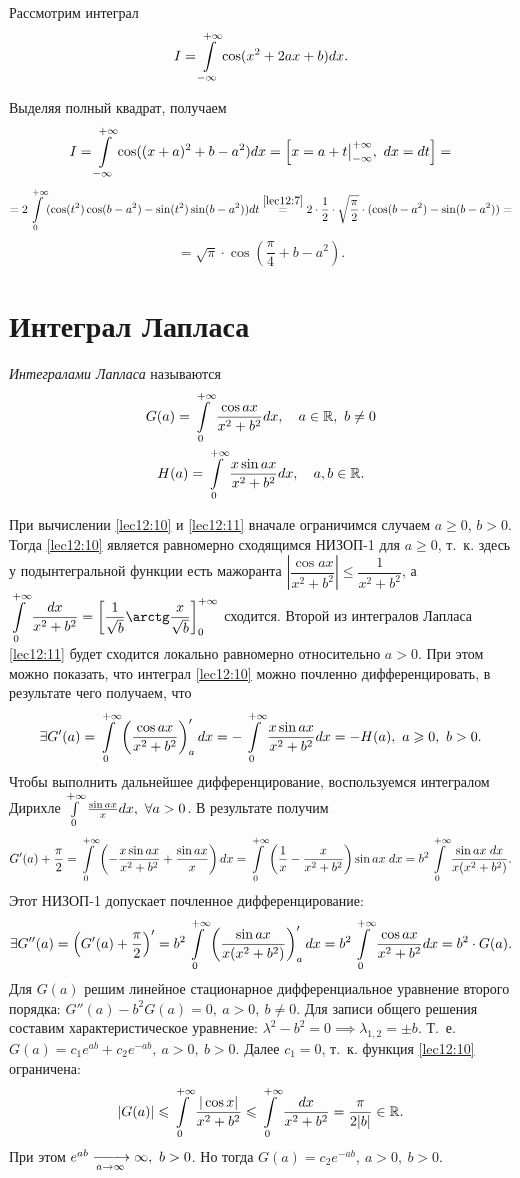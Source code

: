 \documentclass[../../main.tex]{subfiles}
\begin{document}
\begin{exmp}
Рассмотрим интеграл \[I = \int\limits_{-\infty}^{+\infty} \cos(x^2 + 2ax + b) dx.\]

Выделяя полный квадрат, получаем \[I = \int\limits_{-\infty}^{+\infty} \cos((x+a)^2 + b - a^2)dx = 
\left[x = a + t\big|_{-\infty}^{+\infty},\ dx = dt\right] =\]\[= 2 \ioinf 
(\cos(t^2)\cos(b-a^2) - \sin(t^2)\sin(b-a^2)) dt \stk{lec12:7}= 
2\cdot\frac12\cdot \sqrt{\frac\pi2} \cdot (\cos(b - a^2) - \sin(b - a^2)) 
=\]\[ = \sqrt{\pi} \cdot\cos\left(\frac{\pi}4 + b - a^2\right).\]
\end{exmp}

\section{Интеграл Лапласа}

\emph{Интегралами Лапласа} называются
\begin{gather}
\label{lec12:10}
G(a) = \int\limits_{0}^{+\infty} \frac{\cos ax}{x^2 + b^2} dx,\quad a \in \mathbb{R},\ b \ne 0 \\
\label{lec12:11}
H(a) = \int\limits_{0}^{+\infty} \frac{x\sin ax}{x^2 + b^2} dx,\quad a, b \in \mathbb{R}. 
\end{gather}

При вычислении \eqref{lec12:10} и \eqref{lec12:11} вначале ограничимся случаем 
$a \ge 0$, $b > 0$. Тогда \eqref{lec12:10} является равномерно сходящимся 
НИЗОП-1 для $a \ge 0$, т.~к. здесь у подынтегральной функции есть мажоранта 
$\left|\dfrac{\cos{ax}}{x^2 + b^2}\right| \le \dfrac1{x^2 + b^2}$, а 
$\displaystyle\ioinf \frac{dx}{x^2 + b^2} = \left[\frac1{\sqrt b}\arctg\frac 
x{\sqrt b}\right]_0^{+\infty}$ сходится. Второй из интегралов Лапласа 
\eqref{lec12:11} будет сходится локально равномерно относительно $a > 0$. При 
этом можно показать, что интеграл \eqref{lec12:10}  можно почленно 
дифференцировать, в результате чего получаем, что
\[\exists G'(a) = \int\limits_{0}^{+\infty} \left(\frac{\cos ax}{x^2 + b^2}\right)'_a dx = 
-\int\limits_{0}^{+\infty} \frac{x\sin ax}{x^2+b^2} dx = -H(a),\ a \geqslant 0,\ b > 0.\]
Чтобы выполнить дальнейшее дифференцирование, воспользуемся интегралом Дирихле 
$\int\limits_{0}^{+\infty} \frac{\sin ax}x dx,\ \forall a > 0$. В результате получим \[G'(a) + 
\frac\pi2 = \int\limits_{0}^{+\infty} \left(-\frac{x \sin ax}{x^2 + b^2} + \frac{\sin 
ax}{x}\right)dx = \int\limits_{0}^{+\infty} \left(\frac1x - \frac{x}{x^2+b^2}\right)\sin ax\;dx = 
b^2 \int\limits_{0}^{+\infty} \frac{\sin ax\;dx}{x(x^2 + b^2)}.\]
Этот НИЗОП-1 допускает почленное дифференцирование:
\[\exists G''(a) = \left(G'(a) + \frac{\pi}2\right)' = b^2 \int\limits_{0}^{+\infty} 
\left(\frac{\sin ax} {x(x^2 + b^2)}\right)'_a dx = b^2 \int\limits_{0}^{+\infty} \frac{\cos ax} 
{x^2 + b^2} dx = b^2\cdot G(a).\]
Для $G(a)$ решим линейное стационарное дифференциальное уравнение второго 
порядка: $G''(a) - b^2G(a) = 0,\ a > 0,\ b \ne 0$. Для записи общего решения 
составим характеристическое уравнение: $\lambda^2 - b^2 = 0 \implies 
\lambda_{1, 2} = \pm b$. Т.~е. $G(a) = c_1e^{ab} + c_2e^{-ab},\ a > 0,\ b > 
0$. Далее $c_1 = 0$, т.~к. функция \eqref{lec12:10} ограничена:
\[|G(a)| \leqslant \int\limits_{0}^{+\infty} \frac{|\cos x|}{x^2 + b^2} \leqslant \int\limits_{0}^{+\infty} \frac{dx}{x^2 + b^2} 
= \frac\pi{2|b|} \in \mathbb{R}.\] При этом $e^{ab} \xrightarrow[a\to \infty]{} \infty,\ b>0$. 
Но тогда $G(a) = c_2e^{-ab},\ a > 0,\ b > 0$.
\end{document}
